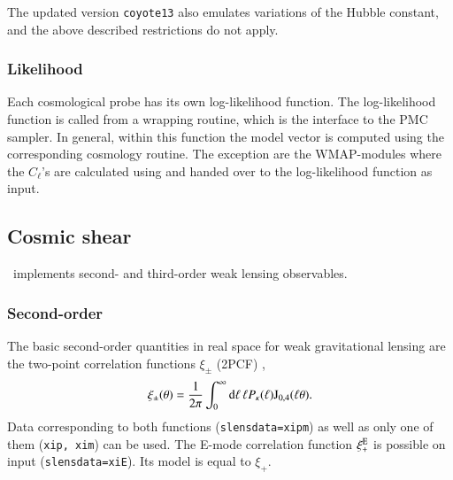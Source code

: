 \documentclass[11pt, chapterprefix, headsepline]{scrartcl}
\begin{document}
The updated version \texttt{coyote13} also emulates variations of the Hubble constant,
and the above described restrictions do not apply.


\subsubsection{Likelihood}

Each cosmological probe has its own log-likelihood function. The
log-likelihood function is called from a wrapping routine, which is
the interface to the PMC sampler. In general, within this function the
model vector is computed using the corresponding cosmology
routine. The exception are the WMAP-modules where the $C_\ell$'s are
calculated using  and handed over to the log-likelihood
function as input.


\subsection{Cosmic shear}

\CosmoPMC\ implements second- and third-order weak lensing
observables.

\subsubsection{Second-order}

The basic second-order quantities in real space for weak gravitational
lensing are the two-point correlation functions $\xi_\pm$ (2PCF)
\citep[e.g][]{1992ApJ...388..272K},
%
\begin{equation}
  \xi_\pm(\theta) = \frac 1 {2\pi} \int_0^\infty {\mathrm d} \ell \,
  \ell P_\kappa(\ell) {\mathrm J}_{0,4}(\ell \theta).
\end{equation}
%
Data corresponding to both functions (\texttt{slensdata=xipm}) as well as only
one of them (\texttt{xip, xim}) can be used. The E-mode correlation function $\xi_+^{\rm E}$
\citep{2002ApJ...568...20C} is possible on input (\texttt{slensdata=xiE}). Its model is equal to $\xi_+$.
\end{document}
